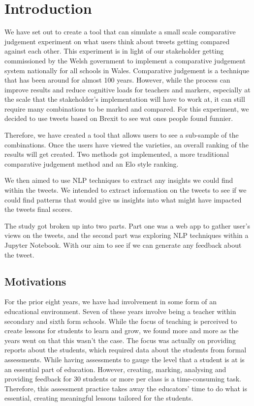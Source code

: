 \chapter{Introduction}
	\label{chap:intro}
	We have set out to create a tool that can simulate a small scale comparative judgement experiment on what users think about tweets getting compared against each other. This experiment is in light of our stakeholder getting commissioned by the Welsh government to implement a comparative judgement system nationally for all schools in Wales. Comparative judgement is a technique that has been around for almost 100 years. However, while the process can improve results and reduce cognitive loads for teachers and markers, especially at the scale that the stakeholder's implementation will have to work at, it can still require many combinations to be marked and compared. For this experiment, we decided to use tweets based on Brexit to see wat ones people found funnier.
	
	Therefore, we have created a tool that allows users to see a sub-sample of the combinations. Once the users have viewed the varieties, an overall ranking of the results will get created. Two methods got implemented, a more traditional comparative judgement method and an Elo style ranking.
	
	We then aimed to use NLP techniques to extract any insights we could find within the tweets. We intended to extract information on the tweets to see if we could find patterns that would give us insights into what might have impacted the tweets final scores.
	
	The study got broken up into two parts. Part one was a web app to gather user's views on the tweets, and the second part was exploring NLP techniques within a Jupyter Notebook. With our aim to see if we can generate any feedback about the tweet.


	\section{Motivations}
		\label{sec:intro_motivation} 
	For the prior eight years, we have had involvement in some form of an educational environment. Seven of these years involve being a teacher within secondary and sixth form schools. While the focus of teaching is perceived to create lessons for students to learn and grow, we found more and more as the years went on that this wasn't the case. The focus was actually on providing reports about the students, which required data about the students from formal assessments. While having assessments to gauge the level that a student is at is an essential part of education. However, creating, marking, analysing and providing feedback for 30 students or more per class is a time-consuming task. Therefore, this assessment practice takes away the educators' time to do what is essential, creating meaningful lessons tailored for the students.
	
